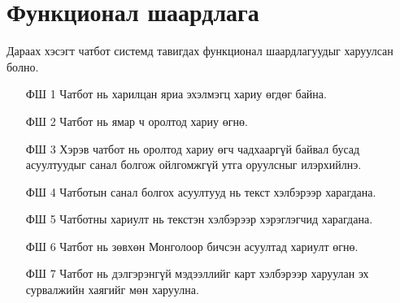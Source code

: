 \section{Функционал шаардлага}
Дараах хэсэгт чатбот системд тавигдах функционал шаардлагуудыг харуулсан болно.
\begin{itemize}
  \item[ФШ 1] Чатбот нь харилцан яриа эхэлмэгц хариу өгдөг байна. 
  \item[ФШ 2] Чатбот нь ямар ч оролтод хариу өгнө.
  \item[ФШ 3] Хэрэв чатбот нь оролтод хариу өгч чадхааргүй байвал бусад асуултуудыг санал болгож ойлгомжгүй утга оруулсныг илэрхийлнэ.
  \item[ФШ 4] Чатботын санал болгох асуултууд нь текст хэлбэрээр харагдана.
  \item[ФШ 5] Чатботны хариулт нь текстэн хэлбэрээр хэрэглэгчид харагдана.
  \item[ФШ 6] Чатбот нь зөвхөн Монголоор бичсэн асуултад хариулт өгнө.
  \item[ФШ 7] Чатбот нь дэлгэрэнгүй мэдээллийг карт хэлбэрээр харуулан эх сурвалжийн хаягийг мөн харуулна. 
  
\end{itemize}

